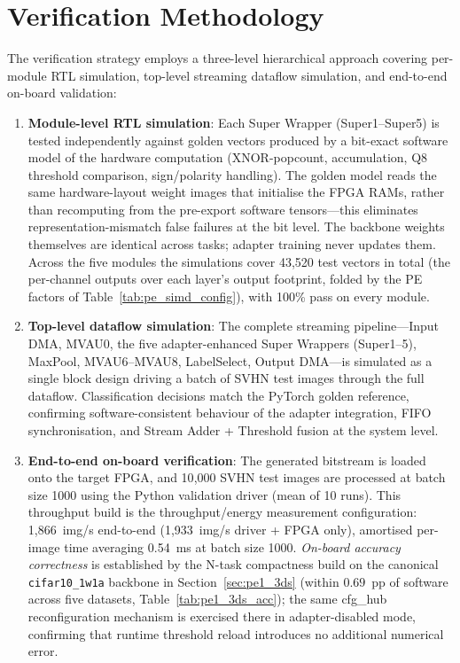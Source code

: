 \documentclass[12pt, a4paper]{report}
\numberwithin{equation}{chapter}
\numberwithin{figure}{chapter}
\numberwithin{table}{chapter}
\numberwithin{algorithm}{chapter}
\begin{document}
\section{Verification Methodology}

The verification strategy employs a three-level hierarchical approach covering per-module RTL simulation, top-level streaming dataflow simulation, and end-to-end on-board validation:

\begin{enumerate}
    \item \textbf{Module-level RTL simulation}: Each Super Wrapper (Super1--Super5) is tested independently against golden vectors produced by a bit-exact software model of the hardware computation (XNOR-popcount, accumulation, Q8 threshold comparison, sign/polarity handling). The golden model reads the same hardware-layout weight images that initialise the FPGA RAMs, rather than recomputing from the pre-export software tensors---this eliminates representation-mismatch false failures at the bit level. The backbone weights themselves are identical across tasks; adapter training never updates them. Across the five modules the simulations cover 43{,}520 test vectors in total (the per-channel outputs over each layer's output footprint, folded by the PE factors of Table~\ref{tab:pe_simd_config}), with 100\% pass on every module.

    \item \textbf{Top-level dataflow simulation}: The complete streaming pipeline---Input DMA, MVAU0, the five adapter-enhanced Super Wrappers (Super1--5), MaxPool, MVAU6--MVAU8, LabelSelect, Output DMA---is simulated as a single block design driving a batch of SVHN test images through the full dataflow. Classification decisions match the PyTorch golden reference, confirming software-consistent behaviour of the adapter integration, FIFO synchronisation, and Stream Adder + Threshold fusion at the system level.

    \item \textbf{End-to-end on-board verification}: The generated bitstream is loaded onto the target FPGA, and 10{,}000 SVHN test images are processed at batch size 1000 using the Python validation driver (mean of 10 runs). This throughput build is the throughput/energy measurement configuration: 1{,}866~img/s end-to-end (1{,}933~img/s driver + FPGA only), amortised per-image time averaging 0.54~ms at batch size 1000. \emph{On-board accuracy correctness} is established by the N-task compactness build on the canonical \texttt{cifar10\_1w1a} backbone in Section~\ref{sec:pe1_3ds} (within $0.69$~pp of software across five datasets, Table~\ref{tab:pe1_3ds_acc}); the same cfg\_hub reconfiguration mechanism is exercised there in adapter-disabled mode, confirming that runtime threshold reload introduces no additional numerical error.
\end{enumerate}
\end{document}
